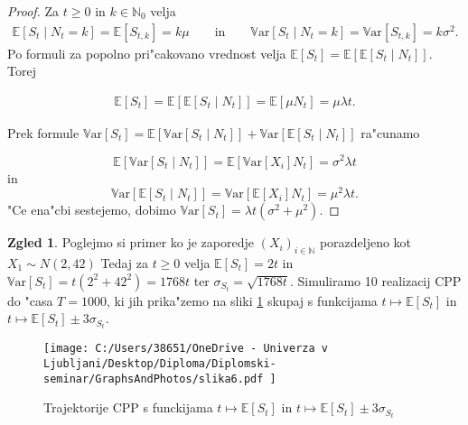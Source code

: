 \documentclass[12pt, a4paper, reqno]{amsart}
\theoremstyle{definition}
\newtheorem{zgled}[definicija]{Zgled}
\theoremstyle{plain}
\newcommand{\N}{\mathbb{N}}
\newcommand{\E}{\mathbb{E}}
\newcommand{\1}{\mathds{1}}
\newcommand{\Var}[1]{\text{$\mathbb{V}\!\mathrm{ar}$}\left[#1\right]}
\begin{document}
        \begin{proof}

            Za $t\geq0$ in $k\in \N_0$ velja 
            \begin{align*}
            \E\left[S_t\mid N_t = k\right] = \E\left[S_{t, k}\right] = k\mu \qquad \text{in} \qquad
            \Var{S_t\mid N_t = k} = \Var{S_{t, k}} = k\sigma^2.
            \end{align*} 
            Po formuli za popolno pri"cakovano vrednost velja 
            $\E\left[S_t\right] = \E\left[\E\left[S_t\mid N_t\right]\right]$. Torej

            \begin{align*}
                \E\left[S_t\right] = \E\left[\E\left[S_t\mid N_t\right]\right] = \E\left[\mu N_t\right] = \mu\lambda t.
            \end{align*}

            \noindent
            Prek formule $\Var{S_t} = \E\left[\Var{S_t\mid N_t}\right] + \Var{\E\left[S_t\mid N_t\right]}$ ra"cunamo 

            \begin{equation*}
                \E\left[\Var{S_t\mid N_t}\right] = \E\left[\Var{X_i}N_t\right] = \sigma^2\lambda t
            \end{equation*}
            in 
            \begin{equation*}
                \Var{\E\left[S_t\mid N_t\right]} = \Var{\E\left[X_i\right]N_t} = \mu^2\lambda t.
            \end{equation*}
            "Ce ena"cbi sestejemo, dobimo $\Var{S_t} = \lambda t\left(\sigma^2 + \mu^2\right)$.
        \end{proof}
    
    \begin{zgled}
        Poglejmo si primer ko je zaporedje $(X_i)_{i\in\N}$ porazdeljeno kot $X_1\sim N(2, 42)$ 
        Tedaj za $t\geq 0 $ velja $\E\left[S_t\right] = 2t$ in 
        $\Var{S_t} = t(2^2 + 42^2) = 1768t$ ter $\sigma_{S_t} = \sqrt{1768t}$. Simuliramo 10 realizacij CPP do "casa $T=1000$, 
        ki jih prika"zemo na sliki \ref{fig:slika6} skupaj s funkcijama $t \mapsto \E\left[S_t\right]$ in $t \mapsto \E\left[S_t\right] \pm 3\sigma_{S_t}$. 
        \begin{figure}[H]
            \centering
            \texttt{[image: 
                C:/Users/38651/OneDrive - Univerza v Ljubljani/Desktop/Diploma/Diplomski-seminar/GraphsAndPhotos/slika6.pdf
                ]}
            \caption{Trajektorije CPP s funckijama $t \mapsto \E\left[S_t\right]$ in $t \mapsto \E\left[S_t\right] \pm 3\sigma_{S_t}$}
            \label{fig:slika6}
        \end{figure}

    \end{zgled}
    
\end{document}
